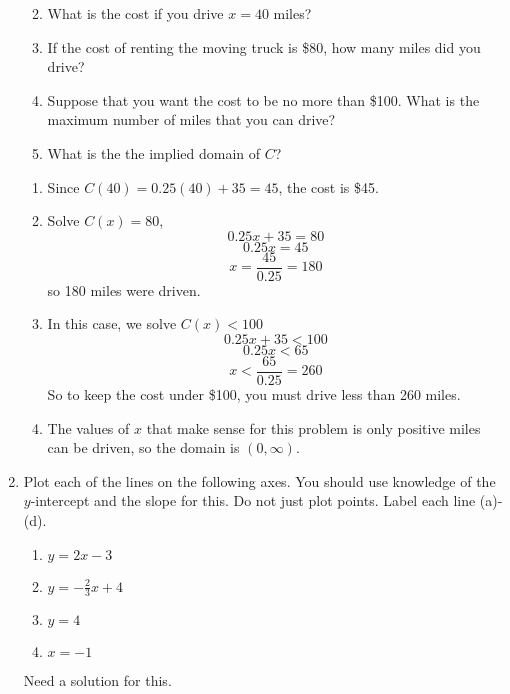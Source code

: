 \documentclass{article}
\providecommand{\tightlist}{%
  \setlength{\itemsep}{3pt}\setlength{\parskip}{3pt}}
\begin{document}
\begin{enumerate}
\begin{enumerate}
\def\labelenumi{\arabic{enumi}.}
\tightlist
\item
  What is the cost if you drive \(x=40\) miles?
\item
  If the cost of renting the moving truck is \$80, how many miles did
  you drive?
\item
  Suppose that you want the cost to be no more than \$100. What is the
  maximum number of miles that you can drive?
\item
  What is the the implied domain of \(C\)?
\end{enumerate}
\hrulefill 

\begin{enumerate}
\def\labelenumi{\arabic{enumi}.}
\tightlist
\item
  Since \(C(40)=0.25(40)+35 = 45\), the cost is \$45.
\item
  Solve \(C(x)=80\), \[0.25x+35=80\] \[0.25x=45\]
  \[x = \frac{45}{0.25}=180\] so 180 miles were driven.
\item
  In this case, we solve \(C(x)<100\) \[0.25x+35<100\] \[0.25x<65\]
  \[x< \frac{65}{0.25} = 260\] So to keep the cost under \$100, you must
  drive less than 260 miles.
\item
  The values of \(x\) that make sense for this problem is only positive
  miles can be driven, so the domain is \((0,\infty)\).
\end{enumerate}


 \hrulefill\item Plot each of the lines on the following axes. You should use knowledge
of the \(y\)-intercept and the slope for this. Do not just plot points.
Label each line (a)-(d).

\begin{enumerate}
\def\labelenumi{\arabic{enumi}.}
\tightlist
\item
  \(y=2x-3\)
\item
  \(y=-\frac{2}{3}x + 4 \)
\item
  \(y=4\)
\item
  \(x=-1\)
\end{enumerate}
\hrulefill 

Need a solution for this.


 \hrulefill

\end{enumerate}
\end{document}
